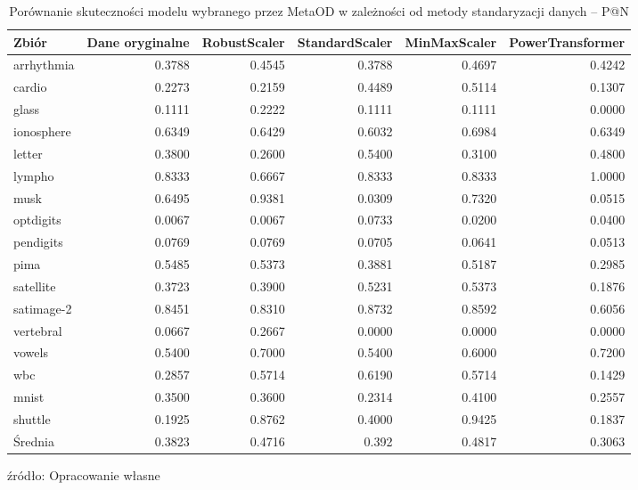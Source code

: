 \begin{sidewaystable}
    \centering
\begin{tabular}{lrrrrr}
      Zbiór & Dane oryginalne & RobustScaler & StandardScaler & MinMaxScaler & PowerTransformer \\ \hline
arrhythmia &               0.3788 &                  0.4545 &            0.3788 &      0.4697 &      0.4242 \\
    cardio &               0.2273 &                  0.2159 &            0.4489 &      0.5114 &      0.1307 \\
     glass &               0.1111 &                  0.2222 &            0.1111 &      0.1111 &      0.0000 \\
ionosphere &               0.6349 &                  0.6429 &            0.6032 &      0.6984 &      0.6349 \\
    letter &               0.3800 &                  0.2600 &            0.5400 &      0.3100 &      0.4800 \\
    lympho &               0.8333 &                  0.6667 &            0.8333 &      0.8333 &      1.0000 \\
      musk &               0.6495 &                  0.9381 &            0.0309 &      0.7320 &      0.0515 \\
 optdigits &               0.0067 &                  0.0067 &            0.0733 &      0.0200 &      0.0400 \\
 pendigits &               0.0769 &                  0.0769 &            0.0705 &      0.0641 &      0.0513 \\
      pima &               0.5485 &                  0.5373 &            0.3881 &      0.5187 &      0.2985 \\
 satellite &               0.3723 &                  0.3900 &            0.5231 &      0.5373 &      0.1876 \\
satimage-2 &               0.8451 &                  0.8310 &            0.8732 &      0.8592 &      0.6056 \\
 vertebral &               0.0667 &                  0.2667 &            0.0000 &      0.0000 &      0.0000 \\
    vowels &               0.5400 &                  0.7000 &            0.5400 &      0.6000 &      0.7200 \\
       wbc &               0.2857 &                  0.5714 &            0.6190 &      0.5714 &      0.1429 \\
     mnist &               0.3500 &                  0.3600 &            0.2314 &      0.4100 &      0.2557 \\
   shuttle &               0.1925 &                  0.8762 &            0.4000 &      0.9425 &      0.1837 \\
\hline
Średnia &0.3823&
0.4716&
0.392&
0.4817&
0.3063

\end{tabular}
    \caption{Porównanie skuteczności modelu wybranego przez MetaOD w zależności od metody standaryzacji danych -- P@N}
    \footnotesize{źródło: Opracowanie własne}
    \label{tab:pn_sc}
\end{sidewaystable}

